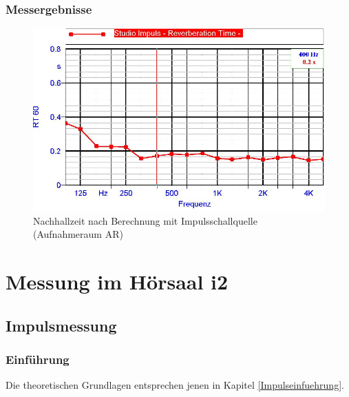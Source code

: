 \documentclass[11pt]{report}
\begin{document}
\subsubsection{Messergebnisse}

\begin{figure}[htbp]
\begin{center}
\includegraphics[width=14cm,keepaspectratio=true]{ImpulsMP1}
\caption{Nachhallzeit nach Berechnung mit Impulsschallquelle (Aufnahmeraum AR)}
\label{fig:i2geometrics}
\end{center}
\end{figure}
\section{Messung im H\"orsaal i2}
\subsection{Impulsmessung}
\subsubsection{Einf\"uhrung}
Die theoretischen Grundlagen entsprechen jenen in Kapitel \ref{Impulseinfuehrung}.
\end{document}
